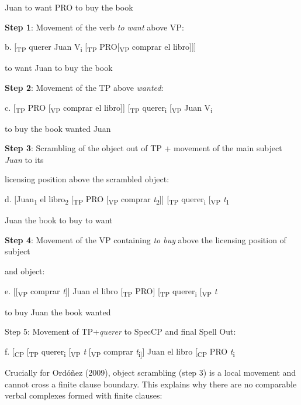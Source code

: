 \documentclass[output=paper]{langsci/langscibook}
\begin{document}
    Juan to want PRO to buy the book

  \textbf{Step 1}: Movement of the verb \textit{to want} above VP:

  b.  [\textsubscript{TP} querer\textsubscript{} Juan V\textsubscript{i} [\textsubscript{TP} PRO[\textsubscript{VP} comprar el libro]]]

    to want Juan to buy the book

  \textbf{Step 2}: Movement of the TP above \textit{wanted}:

  c.   [\textsubscript{TP} PRO [\textsubscript{VP} comprar el libro]] [\textsubscript{TP} querer\textsubscript{i} [\textsubscript{VP} Juan V\textsubscript{i}

    to buy the book wanted Juan

  \textbf{Step 3}: Scrambling of the object out of TP + movement of the main subject \textit{Juan} to its

  licensing position above the scrambled object:

  d.   [Juan\textsubscript{1} el libro\textsubscript{2} [\textsubscript{TP} PRO [\textsubscript{VP} comprar \textit{t}\textsubscript{2}]] [\textsubscript{TP} querer\textsubscript{i} [\textsubscript{VP} \textit{t}\textsubscript{1}

    Juan the book to buy to want

  \textbf{Step 4}: Movement of the VP containing \textit{to buy} above the licensing position of subject

  and object:

  e.   [[\textsubscript{VP} comprar \textit{t}]] Juan el libro [\textsubscript{TP} PRO] [\textsubscript{TP} querer\textsubscript{i} [\textsubscript{VP} \textit{t}

    to buy Juan the book wanted

  Step 5: Movement of TP+\textit{querer} to SpecCP and final Spell Out:

  f.  [\textsubscript{CP} [\textsubscript{TP} querer\textsubscript{i} [\textsubscript{VP} \textit{t} [\textsubscript{VP} comprar \textit{t}\textsubscript{i]}] Juan el libro [\textsubscript{CP} PRO \textit{t}\textsubscript{i}

Crucially for Ordóñez (2009), object scrambling (step 3) is a local movement and cannot cross a finite clause boundary. This explains why there are no comparable verbal complexes formed with finite clauses:

\ea%
    \label{ex:key:19}
    \gll\\
        \\
    \glt
    \z
\end{document}
